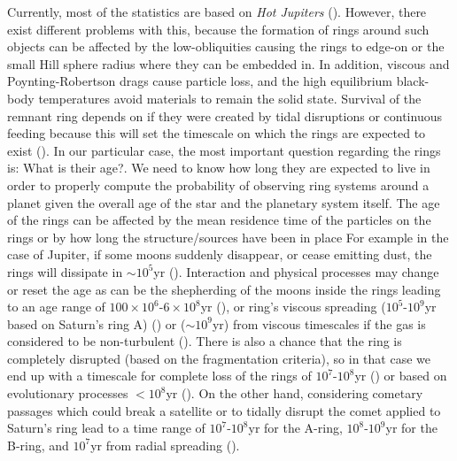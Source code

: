 Currently, most of the statistics are based on \textit{Hot Jupiters}  (\citeyear{2013pss3.book..309T}). However, there exist different problems with this, because the formation of rings around such objects can be affected by the low-obliquities causing the rings to edge-on or the small Hill sphere radius where they can be embedded in. In addition, viscous and Poynting-Robertson drags cause particle loss, and the high equilibrium black-body temperatures avoid materials to remain the solid state. Survival of the remnant ring depends on if they were created by tidal disruptions or continuous feeding because this will set the timescale on which the rings are expected to exist  (\citeyear{1984prin.conf..641H}). In our particular case, the most important question regarding the rings is: What is their age?. We need to know how long they are expected to live in order to properly compute the probability of observing ring systems around a planet given the overall age of the star and the planetary system itself. The age of the rings can be affected by the mean residence time of the particles on the rings or by how long the structure/sources have been in place For example in the case of Jupiter, if some moons suddenly disappear, or cease emitting dust, the rings will dissipate in $\sim 10^5$yr  (\citeyear{2013pss3.book..309T}). Interaction and physical processes may change or reset the age as can be the shepherding of the moons inside the rings leading to an age range of $100\times 10^6$-$6\times10^8$yr  (\citeyear{1994P&SS...42.1139C}), or ring's viscous spreading ($10^5$-$10^9$yr based on Saturn's ring A)  (\citeyear{2009sfch.book..537C}) or ($\sim10^9$yr) from viscous timescales if the gas is considered to be non-turbulent  (\citeyear{1984prin.conf..641H}). There is also a chance that the ring is completely disrupted (based on the fragmentation criteria), so in that case we end up with a timescale for complete loss of the rings of $10^{7}$-$10^8$yr  (\citeyear{1994P&SS...42.1139C}) or based on evolutionary processes $< 10^8$yr  (\citeyear{2009sfch.book..537C}). On the other hand, considering cometary passages which could break a satellite or to tidally disrupt the comet applied to Saturn's ring lead to a time range of $10^7$-$10^8$yr for the A-ring, $10^8$-$10^9$yr for the B-ring, and $10^7$yr from radial spreading  (\citeyear{2009sfch.book..537C}).\\

